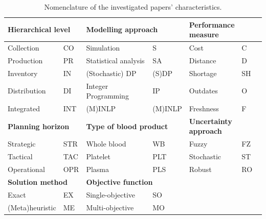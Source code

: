 \documentclass[10pt,twocolumn]{article}
\newcommand{\tabfont}{\fontsize{8}{9.5}\selectfont}
\newcommand{\headfont}{\fontsize{8.5}{10}\selectfont\bfseries}
\begin{document}
\begin{table}[ht]
\caption{Nomenclature of the investigated papers' characteristics.}
\label{tab:nomenclature}
\tabfont
\setlength{\tabcolsep}{5pt}
\begin{tabular}{p{2.5cm}lp{2.5cm}lp{2.5cm}l}
\toprule
\multicolumn{2}{l}{\headfont Hierarchical level}
 & \multicolumn{2}{l}{\headfont Modelling approach}
 & \multicolumn{2}{l}{\headfont Performance measure} \\
\midrule
Collection    & CO & Simulation             & S   & Cost       & C  \\
Production    & PR & Statistical analysis   & SA  & Distance   & D  \\
Inventory     & IN & (Stochastic) DP        & (S)DP & Shortage  & SH \\
Distribution  & DI & Integer Programming    & IP  & Outdates   & O  \\
Integrated    & INT& (M)INLP                & (M)INLP & Freshness & F \\
\midrule
\multicolumn{2}{l}{\headfont Planning horizon}
 & \multicolumn{2}{l}{\headfont Type of blood product}
 & \multicolumn{2}{l}{\headfont Uncertainty approach} \\
\midrule
Strategic     & STR & Whole blood            & WB  & Fuzzy      & FZ \\
Tactical      & TAC & Platelet               & PLT & Stochastic & ST \\
Operational   & OPR & Plasma                 & PLS & Robust     & RO \\
\midrule
\multicolumn{2}{l}{\headfont Solution method}
 & \multicolumn{2}{l}{\headfont Objective function}
 & \multicolumn{2}{l}{} \\
\midrule
Exact         & EX & Single-objective       & SO  &            & \\
(Meta)heuristic & ME & Multi-objective       & MO  &            & \\
\bottomrule
\end{tabular}
\end{table}
\end{document}
